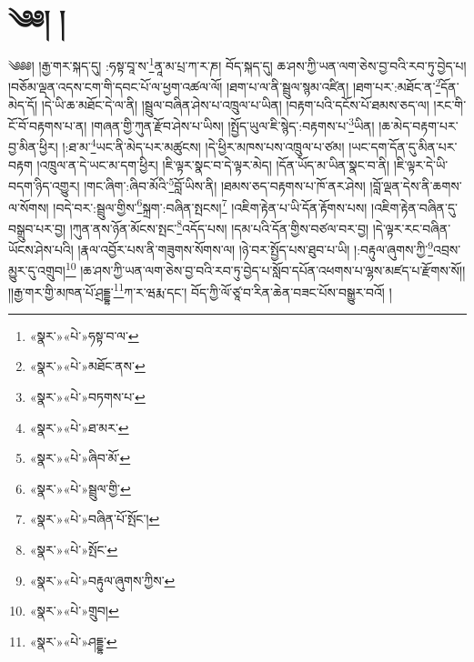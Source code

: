 \chapter{༄༅། །}༄༅༅། །རྒྱ་གར་སྐད་དུ། :ཧསྟ་བཱ་ས་\footnote{«སྣར་»«པེ་»ཧསྟ་བ་ལ་}ནཱ་མ་པྲ་ཀ་ར་ཎ། བོད་སྐད་དུ། ཆ་ཤས་ཀྱི་ཡན་ལག་ཅེས་བྱ་བའི་རབ་ཏུ་བྱེད་པ། །བཅོམ་ལྡན་འདས་ངག་གི་དབང་པོ་ལ་ཕྱག་འཚལ་ལོ། །ཐག་པ་ལ་ནི་སྦྲུལ་སྙམ་འཛིན། །ཐག་པར་:མཐོང་ན་\footnote{«སྣར་»«པེ་»མཐོང་ནས་}དོན་མེད་དོ། །དེ་ཡི་ཆ་མཐོང་དེ་ལ་ནི། །སྦྲུལ་བཞིན་ཤེས་པ་འཁྲུལ་པ་ཡིན། །བརྟག་པའི་དངོས་པོ་ཐམས་ཅད་ལ། །རང་གི་ངོ་བོ་བརྟགས་པ་ན། །གཞན་གྱི་ཀུན་རྫོབ་ཤེས་པ་ཡིས། །སྤྱོད་ཡུལ་ཇི་སྙེད་:བརྟགས་པ་\footnote{«སྣར་»«པེ་»བཏགས་པ་}ཡིན། །ཆ་མེད་བརྟག་པར་བྱ་མིན་ཕྱིར། །:ཐ་མ་\footnote{«སྣར་»«པེ་»ཐ་མར་}ཡང་ནི་མེད་པར་མཚུངས། །དེ་ཕྱིར་མཁས་པས་འཁྲུལ་པ་ཙམ། །ཡང་དག་དོན་དུ་མིན་པར་བརྟག །འཁྲུལ་ན་དེ་ཡང་མ་དག་ཕྱིར། །ཇི་ལྟར་སྣང་བ་དེ་ལྟར་མེད། །དོན་ཡོད་མ་ཡིན་སྣང་བ་ནི། །ཇི་ལྟར་དེ་ཡི་བདག་ཉིད་འགྱུར། །གང་ཞིག་:ཞིབ་མོའི་\footnote{«སྣར་»«པེ་»ཞིབ་མོ་}བློ་ཡིས་ནི། །ཐམས་ཅད་བརྟགས་པ་ཁོ་ནར་ཤེས། །བློ་ལྡན་དེས་ནི་ཆགས་ལ་སོགས། །བདེ་བར་:སྦྲུལ་གྱིས་\footnote{«སྣར་»«པེ་»སྦྲུལ་གྱི་}སྐྲག་:བཞིན་སྤངས།\footnote{«སྣར་»«པེ་»བཞིན་པོ་སྤོང་།} །འཇིག་རྟེན་པ་ཡི་དོན་རྟོགས་པས། །འཇིག་རྟེན་བཞིན་དུ་བསྒྲུབ་པར་བྱ། །ཀུན་ནས་ཉོན་མོངས་སྤང་\footnote{«སྣར་»«པེ་»སྤོང་}འདོད་པས། །དམ་པའི་དོན་གྱིས་བཙལ་བར་བྱ། །དེ་ལྟར་རང་བཞིན་ཡོངས་ཤེས་པའི། །རྣལ་འབྱོར་པས་ནི་གཟུགས་སོགས་ལ། །ཉེ་བར་སྤྱོད་པས་ཐུབ་པ་ཡི། །:བརྟུལ་ཞུགས་ཀྱི་\footnote{«སྣར་»«པེ་»བརྟུལ་ཞུགས་ཀྱིས་}འབྲས་མྱུར་དུ་འགྲུབ།\footnote{«སྣར་»«པེ་»གྲུབ།} །ཆ་ཤས་ཀྱི་ཡན་ལག་ཅེས་བྱ་བའི་རབ་ཏུ་བྱེད་པ་སློབ་དཔོན་འཕགས་པ་ལྷས་མཛད་པ་རྫོགས་སོ།། །།རྒྱ་གར་གྱི་མཁན་པོ་ཤྲདྡྷ་\footnote{«སྣར་»«པེ་»ཤདྡྷ་}ཀ་ར་ཝརྨ་དང་། བོད་ཀྱི་ལོ་ཙཱ་བ་རིན་ཆེན་བཟང་པོས་བསྒྱུར་བའོ། ། 